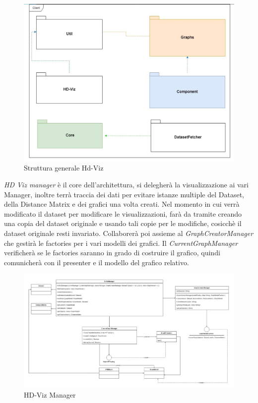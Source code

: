 \documentclass[../manuale_sviluppatore.tex]{subfiles}
\begin{document}
\begin{figure}[H]
	\centering
	\includegraphics[width=18cm]{img/core.jpg}
	\caption{Struttura generale Hd-Viz}
\end{figure}

\emph{HD Viz manager} è il core dell'architettura, si delegherà la visualizzazione ai vari Manager, inoltre terrà traccia 
dei dati per evitare istanze multiple del Dataset, della Distance Matrix e dei grafici una volta creati. Nel momento in cui 
verrà modificato il dataset per modificare le visualizzazioni, farà da tramite creando una copia del dataset originale e usando
tali copie per le modifiche, cosicchè il dataset originale resti invariato.
Collaborerà poi assieme al \emph{GraphCreatorManager} che gestirà le factories per i vari modelli dei grafici. 
Il \emph{CurrentGraphManager} verificherà se le factories saranno in grado di costruire il grafico, quindi comunicherà con il 
presenter e il modello del grafico relativo. \\


\begin{figure}[H]
	\centering
	\includegraphics[width=18cm]{img/core-hdvizmanager.jpg}
	\caption{HD-Viz Manager}
\end{figure}
\end{document}
